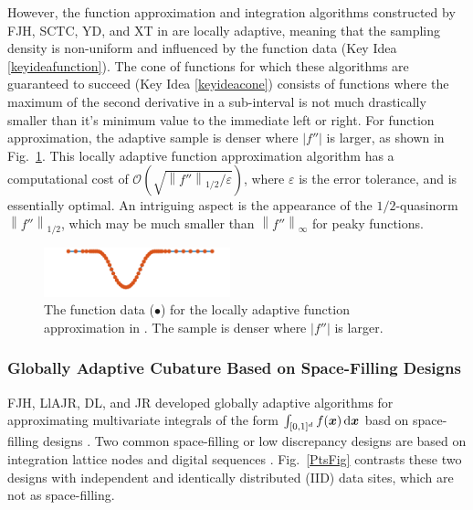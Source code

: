 \documentclass[11pt]{NSFamsart}
\newcommand{\bx}{{\boldsymbol{x}}}
\def\dif{\textup{d}}
\def\abs#1{\ensuremath{\left \lvert #1 \right \rvert}}
\newcommand{\norm}[2][{}]{\ensuremath{\left \lVert #2 \right \rVert}_{#1}}
\newcommand{\Order}{\mathcal{O}}
\begin{document}
However, the function approximation and integration algorithms constructed by FJH, SCTC, YD, and XT in \cite{ChoEtal17a} are locally adaptive, meaning that the sampling density is non-uniform and influenced by the function data (Key Idea \ref{keyideafunction}).  The cone of functions for which these algorithms are guaranteed to succeed (Key Idea \ref{keyideacone}) consists of functions where the maximum of the second derivative in a sub-interval is not much drastically smaller than it's minimum value to the immediate left or right.  For function approximation, the adaptive sample is denser where $\abs{f''}$ is larger, as shown in Fig.\ \ref{localadaptfig}.  This locally adaptive function approximation algorithm has a computational cost of $\Order\left(\sqrt{\norm[1/2]{f''}/\varepsilon} \right)$, where $\varepsilon$ is the error tolerance, and is essentially optimal.  An intriguing aspect is the appearance of the $1/2$-quasinorm $\norm[1/2]{f''}$, which may be much smaller than 
$\norm[\infty]{f''}$ for peaky functions.

\begin{figure}[h]
	\centering
	\vspace{-1ex}
	\includegraphics[width = 0.48\textwidth]{ProgramsImages/sampling-funappxg.png}

	\vspace{-2ex}
	\caption{The function data ({\color{MATLABOrange}$\bullet$}) for the locally adaptive 
	function approximation in \cite{ChoEtal17a}.  The sample is denser where $\abs{f''}$ is larger. \label{localadaptfig}}
\end{figure}

\subsubsection[QMCsec]{Globally Adaptive Cubature Based on Space-Filling Designs} \hypertarget{QMClink}{}
\label{sec:QMC}
FJH, LlAJR, DL, and JR developed globally adaptive algorithms for approximating multivariate integrals of the form  $\int_{[0,1]^d} f(\bx) \, \dif \bx$ basd on space-filling designs \cite{HicJim16a,HicEtal17a,JimHic16a}.  Two common space-filling or low discrepancy designs are based on integration lattice nodes and digital sequences \cite{DicEtal14a}.  Fig.\ \ref{PtsFig} contrasts these two designs with independent and identically distributed (IID) data sites, which are not as space-filling.
\end{document}

